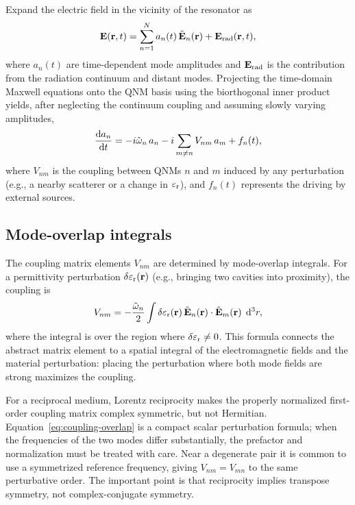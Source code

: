 Expand the electric field in the vicinity of the resonator as
\begin{equation}
 \mathbf{E}(\mathbf{r},t) = \sum_{n=1}^{N} a_n(t)\,\tilde{\mathbf{E}}_n(\mathbf{r})
 + \mathbf{E}_{\mathrm{rad}}(\mathbf{r},t),
 \label{eq:field-expansion}
\end{equation}
where $a_n(t)$ are time-dependent mode amplitudes and
$\mathbf{E}_{\mathrm{rad}}$ is the contribution from the radiation continuum and
distant modes. Projecting the time-domain Maxwell equations onto the
QNM basis using the biorthogonal inner product yields, after neglecting
the continuum coupling and assuming slowly varying amplitudes,
\begin{equation}
 \frac{\mathop{}\!\mathrm{d} a_n}{\mathop{}\!\mathrm{d} t} = -i\tilde{\omega}_n\,a_n - i\sum_{m\neq n} V_{nm}\,a_m
 + f_n(t),
 \label{eq:eom-amplitudes}
\end{equation}
where $V_{nm}$ is the coupling between QNMs $n$ and $m$ induced by any
perturbation (e.g., a nearby scatterer or a change in $\varepsilon_{\mathrm{r}}$), and
$f_n(t)$ represents the driving by external sources.

\subsection{Mode-overlap integrals}
\label{ssec:mode-overlap}

The coupling matrix elements $V_{nm}$ are determined by mode-overlap
integrals. For a permittivity perturbation $\delta\varepsilon_{\mathrm{r}}(\mathbf{r})$
(e.g., bringing two cavities into proximity), the coupling is
\begin{equation}
 V_{nm} = -\frac{\tilde{\omega}_n}{2}
 \int \delta\varepsilon_{\mathrm{r}}(\mathbf{r})\,\tilde{\mathbf{E}}_n(\mathbf{r})\cdot\tilde{\mathbf{E}}_m(\mathbf{r})
 \;\mathop{}\!\mathrm{d}^3r,
 \label{eq:coupling-overlap}
\end{equation}
where the integral is over the region where $\delta\varepsilon_{\mathrm{r}} \neq 0$.
This formula connects the abstract matrix element to a spatial integral
of the electromagnetic fields and the material perturbation: placing the
perturbation where both mode fields are strong maximizes the coupling.

For a reciprocal medium, Lorentz reciprocity makes the properly
normalized first-order coupling matrix complex symmetric, but not
Hermitian. Equation~\eqref{eq:coupling-overlap} is a compact scalar
perturbation formula; when the frequencies of the two modes differ
substantially, the prefactor and normalization must be treated with care.
Near a degenerate pair it is common to use a symmetrized reference
frequency, giving $V_{nm}=V_{mn}$ to the same perturbative order. The
important point is that reciprocity implies transpose symmetry, not
complex-conjugate symmetry.

